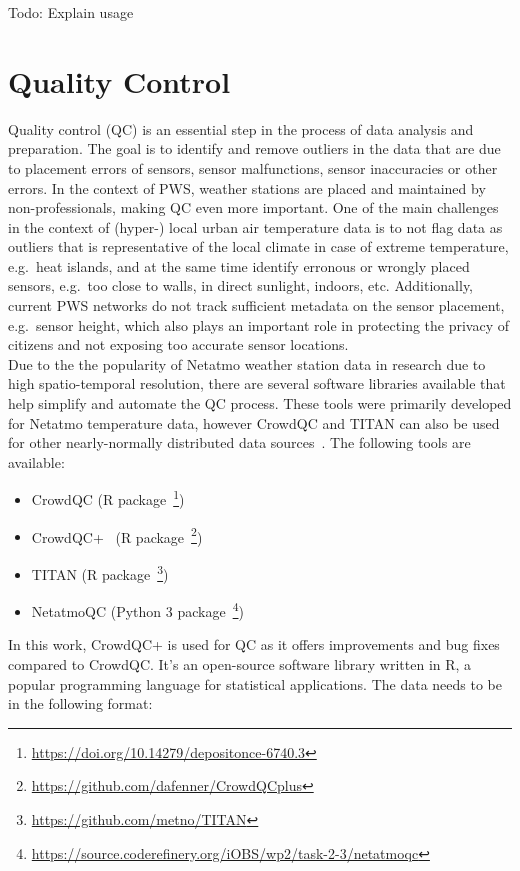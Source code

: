 Todo: Explain usage

\section{Quality Control}
\label{sec:quality control}

Quality control (QC) is an essential step in the process of data analysis and preparation. The goal is to identify and remove outliers in the data that are due to placement errors of sensors, sensor malfunctions, sensor inaccuracies or other errors. In the context of PWS, weather stations are placed and maintained by non-professionals, making QC even more important. One of the main challenges in the context of (hyper-) local urban air temperature data is to not flag data as outliers that is representative of the local climate in case of extreme temperature, e.g.\ heat islands, and at the same time identify erronous or wrongly placed sensors, e.g.\ too close to walls, in direct sunlight, indoors, etc. Additionally, current PWS networks do not track sufficient metadata on the sensor placement, e.g.\ sensor height, which also plays an important role in protecting the privacy of citizens and not exposing too accurate sensor locations.\\
Due to the the popularity of Netatmo weather station data in research due to high spatio-temporal resolution, there are several software libraries available that help simplify and automate the QC process. These tools were primarily developed for Netatmo temperature data, however CrowdQC and TITAN can also be used for other nearly-normally distributed data sources~\cite{hahn2022observations}. The following tools are available:

\begin{itemize}
    \item CrowdQC (R package~\footnote{\url{https://doi.org/10.14279/depositonce-6740.3}})
    \item CrowdQC+~\cite{fenner2021crowdqc+} (R package~\footnote{\url{https://github.com/dafenner/CrowdQCplus}})
    \item TITAN (R package~\footnote{\url{https://github.com/metno/TITAN}})
    \item NetatmoQC (Python 3 package~\footnote{\url{https://source.coderefinery.org/iOBS/wp2/task-2-3/netatmoqc}})
\end{itemize}

In this work, CrowdQC+ is used for QC as it offers improvements and bug fixes compared to CrowdQC. It's an open-source software library written in R, a popular programming language for statistical applications. The data needs to be in the following format:

